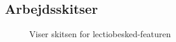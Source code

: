 \documentclass[12pt, a4paper]{article}
\begin{document}
\begin{appendices}
        \section{Arbejdsskitser \label{appendix:arbejdsskitser}} \newpage
        \renewcommand*{\thepage}{C\arabic{page}}
        \begin{figure}[H]
            \centering
        \caption{Viser skitsen for lectiobesked-featuren}
        \end{figure}\newpage
        

\end{appendices}
\end{document}
